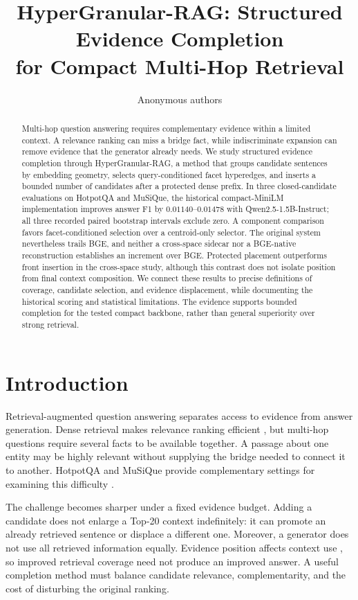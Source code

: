\documentclass[11pt]{article}
\title{HyperGranular-RAG: Structured Evidence Completion\\
for Compact Multi-Hop Retrieval}
\author{Anonymous authors}
\newcommand{\hgrag}{HyperGranular-RAG\xspace}
\begin{document}
\maketitle

\begin{abstract}
Multi-hop question answering requires complementary evidence within a limited
context. A relevance ranking can miss a bridge fact, while indiscriminate
expansion can remove evidence that the generator already needs.
We study structured evidence completion through \hgrag, a method that groups
candidate sentences by embedding geometry, selects query-conditioned facet
hyperedges, and inserts a bounded number of candidates after a protected
dense prefix. In three closed-candidate evaluations on HotpotQA and MuSiQue,
the historical compact-MiniLM implementation improves answer F1 by
$0.01140$--$0.01478$ with Qwen2.5-1.5B-Instruct; all three recorded paired
bootstrap intervals exclude zero. A component comparison favors
facet-conditioned selection over a centroid-only selector. The original system
nevertheless trails BGE, and neither a cross-space sidecar nor a BGE-native
reconstruction establishes an increment over BGE. Protected placement
outperforms front insertion in the cross-space study, although this contrast
does not isolate position from final context composition.
We connect these results to precise definitions of coverage, candidate
selection, and evidence displacement, while documenting the historical scoring
and statistical limitations. The evidence supports bounded completion for the
tested compact backbone, rather than general superiority over strong retrieval.
\end{abstract}

\section{Introduction}
Retrieval-augmented question answering separates access to evidence from
answer generation. Dense retrieval makes relevance ranking efficient
\citep{karpukhin2020dpr}, but multi-hop questions require several facts to be
available together. A passage about one entity may be highly relevant without
supplying the bridge needed to connect it to another. HotpotQA and MuSiQue
provide complementary settings for examining this difficulty
\citep{yang2018hotpotqa,trivedi2022musique}.

The challenge becomes sharper under a fixed evidence budget. Adding a
candidate does not enlarge a Top-20 context indefinitely: it can promote an
already retrieved sentence or displace a different one. Moreover, a generator
does not use all retrieved information equally. Evidence position affects
context use \citep{liu2024lostmiddle}, so improved retrieval coverage need not
produce an improved answer. A useful completion method must balance
candidate relevance, complementarity, and the cost of disturbing the original
ranking.
\end{document}
